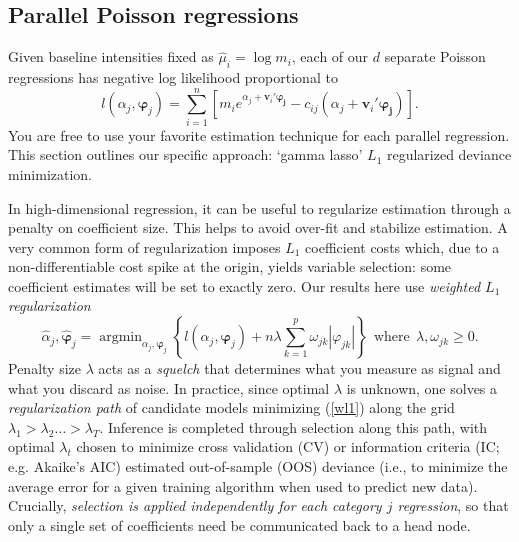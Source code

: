 \documentclass[12pt]{article}
\newcommand{\bs}[1]{\boldsymbol{#1}}
\newcommand{\bm}[1]{\mathbf{#1}}
\DeclareMathOperator*{\argmin}{argmin}
\begin{document}
\subsection{Parallel Poisson regressions}
\label{GL}

Given baseline intensities fixed as $\hat \mu_i = \log m_i$, each of our $d$
separate Poisson regressions has negative log likelihood proportional to
\begin{equation}\label{obj}
l(\alpha_j, \bs{\varphi}_j) = \sum_{i=1}^n \left[ m_i 
e^{\alpha_j + \bm{v}_i'\bs{\varphi_j}} - c_{ij}(\alpha_j + \bm{v}_i'\bs{\varphi_j})\right].
\end{equation}
You are free to use your favorite estimation technique for each parallel
regression. This section outlines our specific approach:  `gamma lasso' $L_1$ regularized deviance minimization.

In high-dimensional regression, it can be useful to regularize estimation
through a penalty on coefficient size.   This helps  to avoid over-fit and
stabilize estimation.
A very common form of regularization imposes $L_1$ coefficient costs
\citep[i.e., the lasso of][]{tibshirani_regression_1996} which, due to
a non-differentiable cost spike at the origin, yields variable selection: some
coefficient estimates will be set to exactly zero.  Our results here use {\it
weighted $L_1$ regularization}
\begin{equation}\label{wl1}
 \hat\alpha_j,\bs{\hat\varphi}_j = \argmin_{\alpha_j,\bs{\varphi}_j} \left\{l(\alpha_j,\bs{\varphi}_j) + n \lambda \sum_{k=1}^p \omega_{jk} |\varphi_{jk} |\right\} ~~\text{where}~~\lambda,\omega_{jk} \geq 0.
\end{equation}
Penalty size $\lambda$ acts as a {\it squelch} that determines what you
measure as signal and what you discard as noise. In practice, since optimal
$\lambda$ is unknown, one solves a {\it regularization path} of candidate
models minimizing (\ref{wl1}) along the grid $\lambda_1 >
\lambda_2 \ldots > \lambda_T$.  Inference is completed through selection
along this path, with optimal $\lambda_t$ chosen to minimize cross validation
(CV) or information criteria (IC; e.g. Akaike's AIC) estimated
out-of-sample (OOS) deviance (i.e., to minimize the average error for a given
training algorithm when used to predict new data).  Crucially,  {\it selection is
applied independently for each category $j$ regression}, so that only a single
set of coefficients need be communicated back to a head node. 
\end{document}
